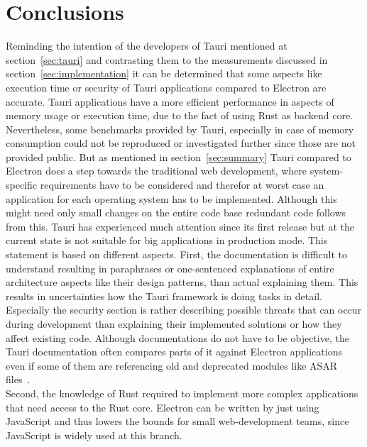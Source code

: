 \section{Conclusions}
\label{sec:conclusion}
Reminding the intention of the developers of Tauri mentioned at section~\ref{sec:tauri} and contrasting them to the measurements discussed in section~\ref{sec:implementation}
it can be determined that some aspects like execution time or security of Tauri applications compared to Electron are accurate.
Tauri applications have a more efficient performance in aspects of memory usage or execution time, due to the fact of using Rust as backend core.
Nevertheless, some benchmarks provided by Tauri, especially in case of memory consumption could not be reproduced or investigated further since those are not provided public.
But as mentioned in section~\ref{sec:summary} Tauri compared to Electron does a step towards the traditional web development, where system-specific requirements have to be considered and
therefor at worst case an application for each operating system has to be implemented.
Although this might need only small changes on the entire code base redundant code follows from this.
Tauri has experienced much attention since its first release but at the current state is not suitable for big applications in production mode.
This statement is based on different aspects.
First, the documentation is difficult to understand resulting in paraphrases or one-sentenced explanations of entire architecture aspects like their design patterns, than actual explaining them.
This results in uncertainties how the Tauri framework is doing tasks in detail.
Especially the security section is rather describing possible threats that can occur during development than explaining their implemented solutions or how they affect existing code.
Although documentations do not have to be objective, the Tauri documentation often compares parts of it against Electron applications even if some of them are referencing old and deprecated modules like ASAR files~\cite{tauri}. \\
Second, the knowledge of Rust required to implement more complex applications that need access to the Rust core.
Electron can be written by just using JavaScript and thus lowers the bounds for small web-development teams, since JavaScript is widely used at this branch.
